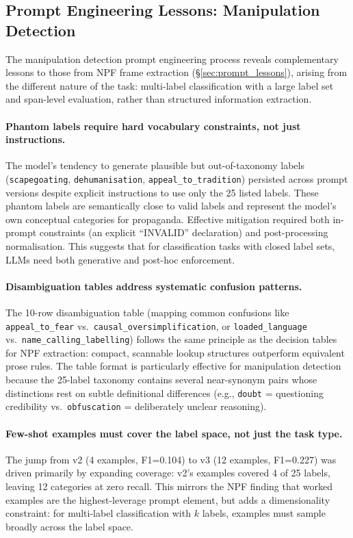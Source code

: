 \documentclass[10pt, a4paper]{article}
\begin{document}
\subsection{Prompt Engineering Lessons: Manipulation Detection}
\label{sec:manipulation_prompt_lessons}

The manipulation detection prompt engineering process reveals complementary lessons to those from NPF frame extraction (\S\ref{sec:prompt_lessons}), arising from the different nature of the task: multi-label classification with a large label set and span-level evaluation, rather than structured information extraction.

\paragraph{Phantom labels require hard vocabulary constraints, not just instructions.}
The model's tendency to generate plausible but out-of-taxonomy labels (\texttt{scapegoating}, \texttt{dehumanisation}, \texttt{appeal\_to\_tradition}) persisted across prompt versions despite explicit instructions to use only the 25 listed labels. These phantom labels are semantically close to valid labels and represent the model's own conceptual categories for propaganda. Effective mitigation required both in-prompt constraints (an explicit ``INVALID'' declaration) and post-processing normalisation. This suggests that for classification tasks with closed label sets, LLMs need both generative and post-hoc enforcement.

\paragraph{Disambiguation tables address systematic confusion patterns.}
The 10-row disambiguation table (mapping common confusions like \texttt{appeal\_to\_fear} vs.\ \texttt{causal\_oversimplification}, or \texttt{loaded\_language} vs.\ \texttt{name\_calling\_labelling}) follows the same principle as the decision tables for NPF extraction: compact, scannable lookup structures outperform equivalent prose rules. The table format is particularly effective for manipulation detection because the 25-label taxonomy contains several near-synonym pairs whose distinctions rest on subtle definitional differences (e.g., \texttt{doubt} = questioning credibility vs.\ \texttt{obfuscation} = deliberately unclear reasoning).

\paragraph{Few-shot examples must cover the label space, not just the task type.}
The jump from v2 (4 examples, F1=0.104) to v3 (12 examples, F1=0.227) was driven primarily by expanding coverage: v2's examples covered 4 of 25 labels, leaving 12 categories at zero recall. This mirrors the NPF finding that worked examples are the highest-leverage prompt element, but adds a dimensionality constraint: for multi-label classification with $k$ labels, examples must sample broadly across the label space.
\end{document}
